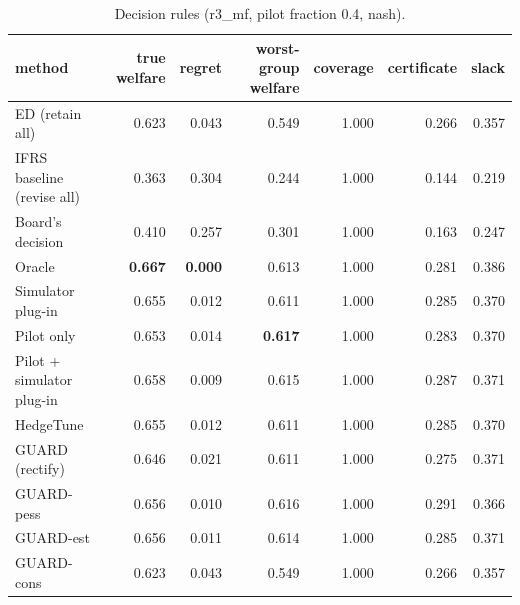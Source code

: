 \begin{table}[t]
\centering
\small
\begin{tabular}{lrrrrrr}
\toprule
method & true welfare & regret & worst-group welfare & coverage & certificate & slack \\
\midrule
ED (retain all) & 0.623 & 0.043 & 0.549 & 1.000 & 0.266 & 0.357 \\
IFRS baseline (revise all) & 0.363 & 0.304 & 0.244 & 1.000 & 0.144 & 0.219 \\
Board's decision & 0.410 & 0.257 & 0.301 & 1.000 & 0.163 & 0.247 \\
Oracle & \textbf{0.667} & \textbf{0.000} & 0.613 & 1.000 & 0.281 & 0.386 \\
Simulator plug-in & 0.655 & 0.012 & 0.611 & 1.000 & 0.285 & 0.370 \\
Pilot only & 0.653 & 0.014 & \textbf{0.617} & 1.000 & 0.283 & 0.370 \\
Pilot + simulator plug-in & 0.658 & 0.009 & 0.615 & 1.000 & 0.287 & 0.371 \\
HedgeTune & 0.655 & 0.012 & 0.611 & 1.000 & 0.285 & 0.370 \\
GUARD (rectify) & 0.646 & 0.021 & 0.611 & 1.000 & 0.275 & 0.371 \\
GUARD-pess & 0.656 & 0.010 & 0.616 & 1.000 & 0.291 & 0.366 \\
GUARD-est & 0.656 & 0.011 & 0.614 & 1.000 & 0.285 & 0.371 \\
GUARD-cons & 0.623 & 0.043 & 0.549 & 1.000 & 0.266 & 0.357 \\
\bottomrule
\end{tabular}
\caption{Decision rules (r3\_mf, pilot fraction 0.4, nash).}
\label{tab:methods-nash}
\end{table}
